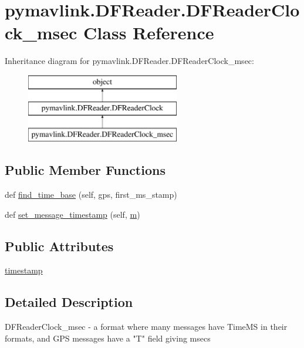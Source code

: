 \hypertarget{classpymavlink_1_1DFReader_1_1DFReaderClock__msec}{}\section{pymavlink.\+D\+F\+Reader.\+D\+F\+Reader\+Clock\+\_\+msec Class Reference}
\label{classpymavlink_1_1DFReader_1_1DFReaderClock__msec}
Inheritance diagram for pymavlink.\+D\+F\+Reader.\+D\+F\+Reader\+Clock\+\_\+msec\+:\begin{figure}[H]
\begin{center}
\leavevmode
\includegraphics[height=3.000000cm]{classpymavlink_1_1DFReader_1_1DFReaderClock__msec}
\end{center}
\end{figure}
\subsection*{Public Member Functions}
\begin{DoxyCompactItemize}
\item 
def \mbox{\hyperlink{classpymavlink_1_1DFReader_1_1DFReaderClock__msec_a175357de9e67b92d2977d9aab2a3fe1a}{find\+\_\+time\+\_\+base}} (self, gps, first\+\_\+ms\+\_\+stamp)
\item 
def \mbox{\hyperlink{classpymavlink_1_1DFReader_1_1DFReaderClock__msec_a66a8cb335b6ff41e1390e9a8e9bf292a}{set\+\_\+message\+\_\+timestamp}} (self, \mbox{\hyperlink{namespacepymavlink_1_1DFReader_a41dcad484f9dfcaca656786d0882f168}{m}})
\end{DoxyCompactItemize}
\subsection*{Public Attributes}
\begin{DoxyCompactItemize}
\item 
\mbox{\hyperlink{classpymavlink_1_1DFReader_1_1DFReaderClock__msec_a98740f18c4eded09309955cc7fbbb44c}{timestamp}}
\end{DoxyCompactItemize}


\subsection{Detailed Description}
\begin{DoxyVerb}DFReaderClock_msec - a format where many messages have TimeMS in
their formats, and GPS messages have a "T" field giving msecs\end{DoxyVerb}
 

